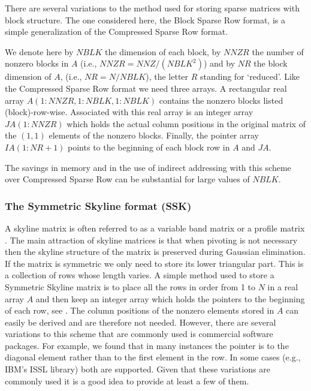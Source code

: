\documentclass[12pt]{article}
\begin{document}
There are several variations to the method used for storing sparse
matrices with block structure. The one considered here, the Block
Sparse Row format, is a simple generalization of the Compressed Sparse
Row format.

We denote here by $NBLK$ the dimension of each block, by 
$NNZR$ the number of nonzero blocks in $A$ (i.e., 
$NNZR = NNZ/(NBLK^2) $) and by $NR$ the block dimension of $A$,
(i.e., $NR = N/NBLK$), the letter $R$ standing for `reduced'. 
Like the Compressed Sparse Row  format we need three arrays. A rectangular
real array $A(1:NNZR,1:NBLK,1:NBLK) $ contains the nonzero
blocks listed (block)-row-wise. Associated with this real array
is an integer array 
$JA(1:NNZR) $ which holds the actual column positions in the 
original matrix of the $(1,1)$ elements of the nonzero blocks.
Finally, the pointer array $IA(1:NR+1)$ points to the beginning
of each block row in $A$ and $JA$. 

The savings in memory and in the use of indirect addressing with  this
scheme over Compressed Sparse Row   can be substantial for large
values of $NBLK$.

\subsubsection{The Symmetric Skyline format (SSK) }
A skyline matrix is often referred to as a variable band
matrix or a profile matrix \cite{Duff-book}.  The main 
attraction of skyline matrices is that when pivoting is
not necessary then the skyline structure of the matrix is preserved 
during Gaussian elimination. If the matrix is symmetric
we only need to store its lower triangular part. This is a
collection of rows whose length varies. A simple method used to store
a Symmetric Skyline matrix is to place all the rows in order from
1 to $N$ in a  real array $A$ and then keep an integer array which holds 
the pointers to the beginning of each row, see \cite{Duff-survey}.
The column positions of the nonzero elements stored in $A$
can easily be derived and are therefore not needed. However, there 
are several variations to this scheme that are commonly used is
commercial software packages. For example, we found that in many 
instances the pointer is to the diagonal element rather than to the 
first element in the row. In some cases (e.g., IBM's ISSL library)
both are supported. Given that these variations are commonly used 
it is a good idea to provide at least a few of them. 
\end{document}
